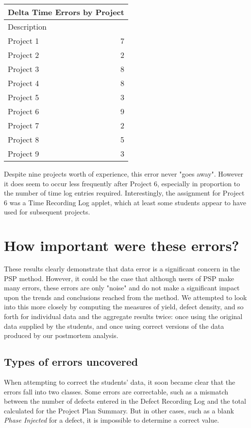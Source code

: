 \begin{tabular}{|l|r|}\hline
\multicolumn{2}{|c|}{\bf Delta Time Errors by Project}\\ \hline
Description & \\ \hline\hline
Project 1  & 7 \\ \hline
Project 2  & 2 \\ \hline
Project 3  & 8 \\ \hline
Project 4  & 8 \\ \hline
Project 5  & 3 \\ \hline
Project 6  & 9 \\ \hline
Project 7  & 2 \\ \hline
Project 8  & 5 \\ \hline
Project 9  & 3 \\ \hline

\end{tabular}

Despite nine projects worth of experience, this error never "goes away".
However it does seem to occur less frequently after Project 6, 
especially
in proportion to the number of time log entries required.  
Interestingly,
the assignment for Project 6 was a Time Recording Log applet, which at 
least
some students appear to have used for subsequent projects.

\section{How important were these errors?}

These results clearly demonstrate that data error is a significant
concern in the PSP method.  However, it could be the case that
although users of PSP make many errors, these errors are only "noise"
and do not make a significant impact upon the trends and conclusions
reached from the method.  We attempted to look into this more closely
by computing the measures of yield, defect density, and so forth for
individual data and the aggregate results twice:  once using the
original data supplied by the students, and once using correct
versions of the data produced by our postmortem analysis.

\subsection{Types of errors uncovered}

When attempting to correct the students' data, it soon became clear that
the errors fall into two classes.  Some errors are correctable, such as 
a
mismatch between the number of defects entered in the Defect Recording 
Log
and the total calculated for the Project Plan Summary.  But in other 
cases,
such as a blank {\it Phase Injected} for a defect, it is impossible to
determine a correct value.

